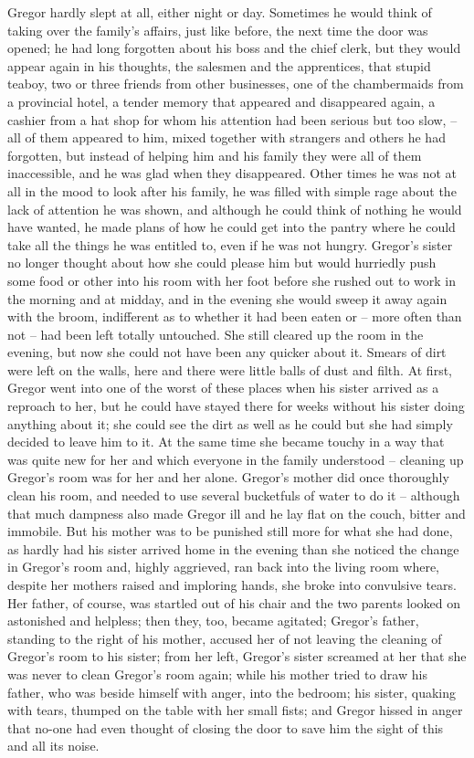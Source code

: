 Gregor hardly slept at all, either night or day. Sometimes he would
think of taking over the family’s affairs, just like before, the next
time the door was opened; he had long forgotten about his boss and the
chief clerk, but they would appear again in his thoughts, the salesmen
and the apprentices, that stupid teaboy, two or three friends from
other businesses, one of the chambermaids from a provincial hotel, a
tender memory that appeared and disappeared again, a cashier from a hat
shop for whom his attention had been serious but too slow, – all of them
appeared to him, mixed together with strangers and others he had
forgotten, but instead of helping him and his family they were all of
them inaccessible, and he was glad when they disappeared. Other times
he was not at all in the mood to look after his family, he was filled
with simple rage about the lack of attention he was shown, and although
he could think of nothing he would have wanted, he made plans of how he
could get into the pantry where he could take all the things he was
entitled to, even if he was not hungry. Gregor’s sister no longer
thought about how she could please him but would hurriedly push some
food or other into his room with her foot before she rushed out to work
in the morning and at midday, and in the evening she would sweep it
away again with the broom, indifferent as to whether it had been eaten
or – more often than not – had been left totally untouched. She still
cleared up the room in the evening, but now she could not have been any
quicker about it. Smears of dirt were left on the walls, here and there
were little balls of dust and filth. At first, Gregor went into one of
the worst of these places when his sister arrived as a reproach to her,
but he could have stayed there for weeks without his sister doing
anything about it; she could see the dirt as well as he could but she
had simply decided to leave him to it. At the same time she became
touchy in a way that was quite new for her and which everyone in the
family understood – cleaning up Gregor’s room was for her and her alone.
Gregor’s mother did once thoroughly clean his room, and needed to use
several bucketfuls of water to do it – although that much dampness also
made Gregor ill and he lay flat on the couch, bitter and immobile. But
his mother was to be punished still more for what she had done, as
hardly had his sister arrived home in the evening than she noticed the
change in Gregor’s room and, highly aggrieved, ran back into the living
room where, despite her mothers raised and imploring hands, she broke
into convulsive tears. Her father, of course, was startled out of his
chair and the two parents looked on astonished and helpless; then they,
too, became agitated; Gregor’s father, standing to the right of his
mother, accused her of not leaving the cleaning of Gregor’s room to his
sister; from her left, Gregor’s sister screamed at her that she was
never to clean Gregor’s room again; while his mother tried to draw his
father, who was beside himself with anger, into the bedroom; his
sister, quaking with tears, thumped on the table with her small fists;
and Gregor hissed in anger that no-one had even thought of closing the
door to save him the sight of this and all its noise.

